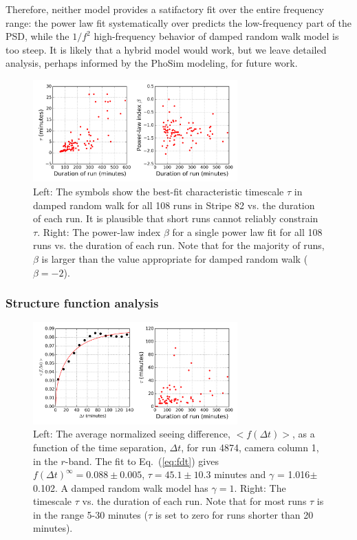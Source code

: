 Therefore, neither model provides a satifactory fit over the entire frequency range: 
the power law fit systematically over predicts the low-frequency part of the PSD,
while the $1/f^2$ high-frequency behavior of damped random walk model is too 
steep. It is likely that a hybrid model would work, but we leave detailed analysis,
perhaps informed by the PhoSim modeling, for future work. 


\begin{figure}[th]
\centering
\includegraphics[width=0.7\textwidth]{FIGURES/taubeta.png}
\vskip -0.2in
\caption{Left: The symbols show the best-fit characteristic timescale $\tau$ in 
damped random walk for all 108 runs in Stripe 82 vs. the duration of 
each run. It is plausible that short runs cannot reliably constrain $\tau$.
Right: The power-law index $\beta$ for a single power law fit for all 108 
runs vs. the duration of each run. Note that for the majority of runs, $\beta$
is larger than the value appropriate for damped random walk ($\beta = -2$). 
\label{fig:hist}}
\end{figure}



\subsubsection{Structure function analysis} 


\begin{figure}[th]
\centering
\includegraphics[width=0.7\textwidth]{FIGURES/fdt.png}
\caption{Left: The average normalized seeing difference, $<f(\Delta t)>$, as
  a function of the time separation, $\Delta t$, for run 4874, camera
   column 1, in the $r$-band. The fit to Eq.~(\ref{eq:fdt}) gives $f(\Delta t) ^\infty =  
   0.088\pm0.005$, $\tau = 45.1\pm10.3$ minutes and $\gamma$ =
   1.016$\pm$0.102. 
A damped random walk model has $\gamma=1$.
Right: The timescale $\tau$ vs. the duration of each run.
 Note that for most runs $\tau$ is in the range 5-30 minutes
    ($\tau$ is set to zero for runs shorter than 20 minutes).  
\label{fig:fdt}}
\end{figure}


